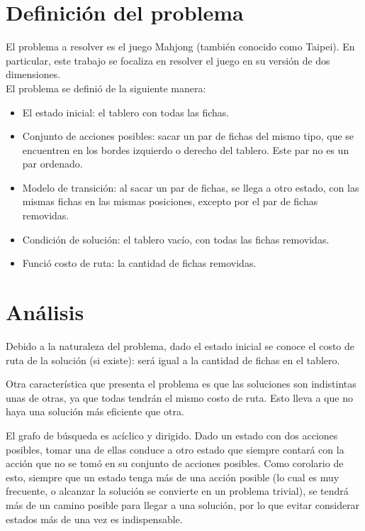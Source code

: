 \documentclass[a4paper,10pt]{article}
\begin{document}
\setcounter{page}{1}


\section{Definición del problema}

    El problema a resolver es el juego Mahjong (también conocido como Taipei). En particular, este trabajo se focaliza en resolver el juego en su versión de dos dimensiones. \\

    El problema se definió de la siguiente manera:

    \begin{itemize}
        \item El estado inicial: el tablero con todas las fichas.
        \item Conjunto de acciones posibles: sacar un par de fichas del mismo tipo, que se encuentren en los bordes izquierdo o derecho del tablero. Este par no es un par ordenado.
        \item Modelo de transición: al sacar un par de fichas, se llega a otro estado, con las mismas fichas en las mismas posiciones, excepto por el par de fichas removidas.
        \item Condición de solución: el tablero vacío, con todas las fichas removidas.
        \item Funció costo de ruta: la cantidad de fichas removidas.
    \end{itemize}

\section{Análisis}

    \label{sec:problem_properties}
    Debido a la naturaleza del problema, dado el estado inicial se conoce el costo de ruta de la solución (si existe): será igual a la cantidad de fichas en el tablero.

    Otra característica que presenta el problema es que las soluciones son indistintas unas de otras, ya que todas tendrán el mismo costo de ruta. Esto lleva a que no haya una 
    solución más eficiente que otra.

    El grafo de búsqueda es acíclico y dirigido. Dado un estado con dos acciones posibles, tomar una de ellas conduce a otro estado que siempre contará con la acción que no se 
    tomó en su conjunto de acciones posibles. Como corolario de esto, siempre que un estado tenga más de una acción posible (lo cual es muy frecuente, o alcanzar la solución se 
    convierte en un problema trivial), se tendrá más de un camino posible para llegar a una solución, por lo que evitar considerar estados más de una vez es indispensable.
\end{document}
